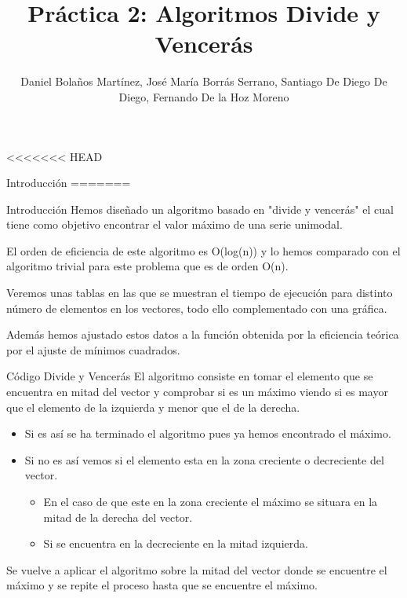 \documentclass[12pt]{beamer}
\author{Daniel Bolaños Martínez, José María Borrás Serrano, Santiago De Diego De Diego, Fernando De la Hoz Moreno}
\title{Práctica 2: Algoritmos Divide y Vencerás}
\institute{ETSIIT}
\date{}
\begin{document}
\begin{frame}
\titlepage
\end{frame}

<<<<<<< HEAD
\begin{frame}{Introducción}
=======

\begin{frame}{Introducción}
Hemos diseñado un algoritmo basado en "divide y vencerás" el cual tiene como objetivo encontrar el valor máximo de una serie unimodal. 

\vspace{5mm} %

El orden de eficiencia de este algoritmo es O(log(n)) y lo hemos comparado con el algoritmo trivial para este problema que es de orden O(n).
\end{frame}
\begin{frame}
Veremos unas tablas en las que se muestran el tiempo de ejecución para distinto número de elementos en los vectores, todo ello complementado con una gráfica.

\vspace{5mm} %

Además hemos ajustado estos datos a la función obtenida por la eficiencia teórica por el ajuste de mínimos cuadrados.
\end{frame}

\begin{frame}{Código Divide y Vencerás}
El algoritmo consiste en tomar el elemento que se encuentra en mitad del vector y comprobar si es un máximo viendo si es mayor que el elemento de la izquierda y menor que el de la derecha. 

\vspace{2mm} %

\begin{itemize}
\item Si es así se ha terminado el algoritmo pues ya hemos encontrado el máximo. 
\item Si no es así vemos si el elemento esta en la zona creciente o decreciente del vector.
	\begin{itemize}
	\item En el caso de que este en la zona creciente el máximo se situara en la mitad de la derecha del vector.
	\item Si se encuentra en la decreciente en la mitad izquierda.
	\end{itemize}
\end{itemize}
Se vuelve a aplicar el algoritmo sobre la mitad del vector donde se encuentre el máximo y se repite el proceso hasta que se encuentre el máximo.
\end{frame}


\end{frame}
\end{document}
